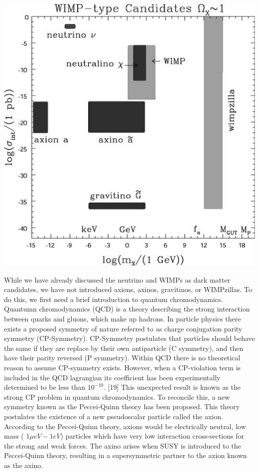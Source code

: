 \documentclass[a4paper,12pt]{article}
\begin{document}
\begin{center}
\includegraphics[scale=0.7]{DMCandidates.png}
\end{center}

While we have already discussed the neutrino and WIMPs as dark matter candidates, we have not introduced  axions, axinos, gravitinos, or WIMPzillas.  To do this, we first need a brief introduction to quantum chromodynamics.  Quantumn chromodynamics (QCD) is a theory describing the strong interaction between quarks and gluons, which make up hadrons.  In particle physics there exists a proposed symmetry of nature referred to as charge conjugation parity symmetry (CP-Symmetry).  CP-Symmetry postulates that particles should behave the same if they are replace by their own antiparticle (C symmetry), and then have their parity reversed (P symmetry). Within QCD there is no theoretical reason to assume CP-symmetry exists.  However, when a CP-violation term is included in the QCD lagrangian its coefficient has been experimentally determined to be less than $10^{-10}$. [19] This unexpected result is known as the strong CP problem in quantum chromodynamics.    To reconcile this, a new symmetry known as the Peccei-Quinn theory has been proposed.  This theory postulates the existence of a new pseudoscalar particle called the axion.  According to the Peccei-Quinn theory, axions would be electrically neutral, low mass ( $1\mu eV - 1 eV$) particles which have very low interaction cross-sections for the strong and weak forces.  The axino arises when SUSY is introduced to the Peccei-Quinn theory, resulting in a supersymmetric partner to the axion known as the axino.
\end{document}

